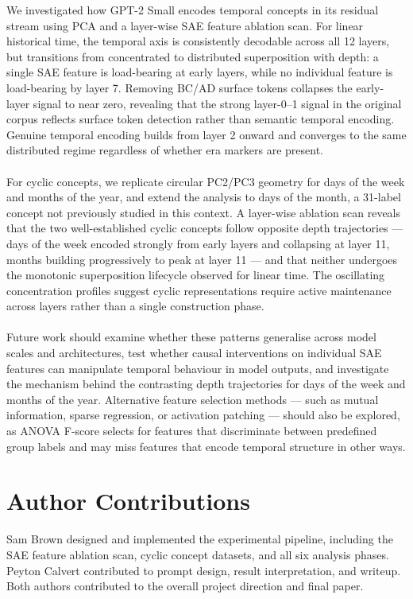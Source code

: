 \documentclass[11pt]{article}
\begin{document}
We investigated how GPT-2 Small encodes temporal concepts in its residual stream using PCA and a layer-wise SAE feature ablation scan.
For linear historical time, the temporal axis is consistently decodable across all 12 layers, but transitions from concentrated to
distributed superposition with depth: a single SAE feature is load-bearing at early layers, while no individual feature is
load-bearing by layer 7. Removing BC/AD surface tokens collapses the early-layer signal to near zero, revealing that the strong
layer-0--1 signal in the original corpus reflects surface token detection rather than semantic temporal encoding. Genuine temporal
encoding builds from layer 2 onward and converges to the same distributed regime regardless of whether era markers are present.
\\
\\
For cyclic concepts, we replicate circular PC2/PC3 geometry for days of the week and months of the year, and extend the analysis
to days of the month, a 31-label concept not previously studied in this context. A layer-wise ablation scan reveals that the two
well-established cyclic concepts follow opposite depth trajectories --- days of the week encoded strongly from early layers and
collapsing at layer 11, months building progressively to peak at layer 11 --- and that neither undergoes the monotonic superposition
lifecycle observed for linear time. The oscillating concentration profiles suggest cyclic representations require active maintenance
across layers rather than a single construction phase.
\\
\\
Future work should examine whether these patterns generalise across model scales and architectures, test whether causal interventions
on individual SAE features can manipulate temporal behaviour in model outputs, and investigate the mechanism behind the contrasting
depth trajectories for days of the week and months of the year. Alternative feature selection methods --- such as mutual information,
sparse regression, or activation patching --- should also be explored, as ANOVA F-score selects for features that discriminate
between predefined group labels and may miss features that encode temporal structure in other ways.


\section*{Author Contributions}
Sam Brown designed and implemented the experimental pipeline, including the SAE feature ablation scan, cyclic concept datasets,
and all six analysis phases. Peyton Calvert contributed to prompt design, result interpretation, and writeup.
Both authors contributed to the overall project direction and final paper.
\end{document}
